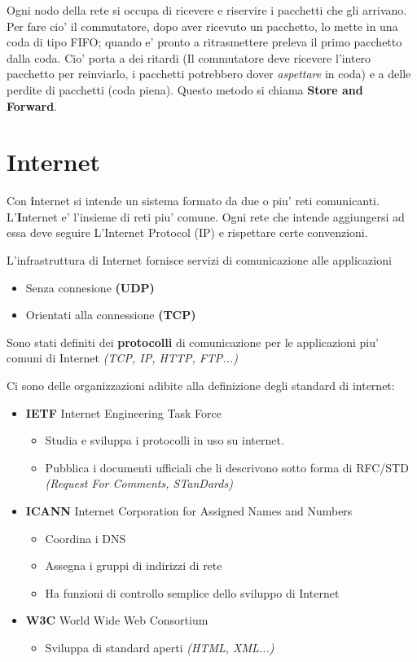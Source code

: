 Ogni nodo della rete si occupa di ricevere e riservire i pacchetti che gli arrivano. Per fare cio' il commutatore, dopo aver ricevuto un pacchetto, lo mette in una coda di tipo FIFO; quando e' pronto a ritrasmettere preleva il primo pacchetto dalla coda.
Cio' porta a dei ritardi (Il commutatore deve ricevere l'intero pacchetto per reinviarlo, i pacchetti potrebbero dover \textit{aspettare} in coda) e a delle perdite di pacchetti (coda piena).\newline
Questo metodo si chiama \textbf{Store and Forward}.
\section{Internet}
Con \textbf{i}nternet si intende un sistema formato da due o piu' reti comunicanti.
L'\textbf{I}nternet e' l'insieme di reti piu' comune. Ogni rete che intende aggiungersi ad essa deve seguire L'Internet Protocol (IP) e rispettare certe convenzioni.

L'infrastruttura di Internet fornisce servizi di comunicazione alle applicazioni
\begin{itemize}
    \item Senza connesione \textbf{(UDP)}
    \item Orientati alla connessione \textbf{(TCP)}
\end{itemize}

Sono stati definiti dei \textbf{protocolli} di comunicazione per le applicazioni piu' comuni di Internet \textit{(TCP, IP, HTTP, FTP...)}

Ci sono delle organizzazioni adibite alla definizione degli standard di internet:
\begin{itemize}
    \item \textbf{IETF} Internet Engineering Task Force
    \begin{itemize}
        \item Studia e sviluppa i protocolli in uso su internet.
        \item Pubblica i documenti ufficiali che li descrivono sotto forma di RFC/STD \textit{(Request For Comments, STanDards)}
    \end{itemize}
    \item \textbf{ICANN} Internet Corporation for Assigned Names and Numbers
    \begin{itemize}
        \item Coordina i DNS
        \item Assegna i gruppi di indirizzi di rete
        \item Ha funzioni di controllo semplice dello sviluppo di Internet
    \end{itemize}
    \item \textbf{W3C} World Wide Web Consortium
    \begin{itemize}
        \item Sviluppa di standard aperti \textit{(HTML, XML...)}
    \end{itemize}
\end{itemize}

